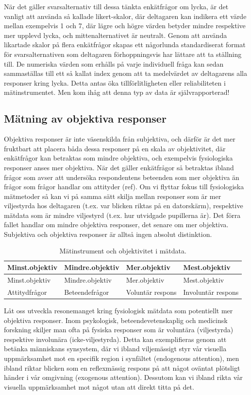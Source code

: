 \documentclass[
]{book}
\begin{document}
När det gäller svarsalternativ till dessa tänkta enkätfrågor om lycka, är det vanligt att använda så kallade likert-skalor, där deltagaren kan indikera ett värde mellan exempelvis 1 och 7, där lägre och högre värden betyder mindre respektive mer upplevd lycka, och mittenalternativet är neutralt. Genom att använda likartade skalor på flera enkätfrågor skapas ett någorlunda standardiserat format för svarsalternativen som deltagaren förhoppningsvis har lättare att ta ställning till. De numeriska värden som erhålls på varje individuell fråga kan sedan sammaställas till ett så kallat index genom att ta medelvärdet av deltagarens alla responser kring lycka. Detta antas öka tillförlitligheten eller reliabiliteten i mätinstrumentet. Men kom ihåg att denna typ av data är självrapporterad!

\hypertarget{sub07.3.3}{%
\subsection{Mätning av objektiva responser}\label{sub07.3.3}}

Objektiva responser är inte väsenskilda från subjektiva, och därför är det mer fruktbart att placera båda dessa responser på en skala av objektivitet, där enkätfrågor kan betraktas som mindre objektiva, och exempelvis fysiologiska responser anses mer objektiva. När det gäller enkätfrågor så betraktas ibland frågor som avser att undersöka respondentens beteenden som mer objektiva än frågor som frågor handlar om attityder (ref). Om vi flyttar fokus till fysiologiska mätmetoder så kan vi på samma sätt skilja mellan responser som är mer viljestyrda hos deltagaren (t.ex. var blicken riktas på en datorskärm), respektive mätdata som är mindre viljestyrd (t.ex. hur utvidgade pupillerna är). Det förra fallet handlar om mindre objektiva responser, det senare om mer objektiva. Subjektiva och objektiva responser är alltså ingen absolut distinktion.

\begin{longtable}[]{@{}llll@{}}
\caption{\label{tab:tab-02-07-3-3-01}Mätinstrument och objektivitet i mätdata.}\tabularnewline
\toprule
Minst.objektiv & Mindre.objektiv & Mer.objektiv & Mest.objektiv\tabularnewline
\midrule
\endfirsthead
\toprule
Minst.objektiv & Mindre.objektiv & Mer.objektiv & Mest.objektiv\tabularnewline
\midrule
\endhead
Attitydfrågor & Beteendefrågor & Voluntär respons & Involuntär respons\tabularnewline
\bottomrule
\end{longtable}

Låt oss utveckla resonemanget kring fysiologisk mätdata som potentiellt mer objektiva responser. Inom psykologisk, beteendevetenskaplig och medicinsk forskning skiljer man ofta på fysiska responser som är voluntära (viljestyrda) respektive involunära (icke-viljestyrda). Detta kan exemplifieras genom att betänka människans synsystem, där vi ibland viljemässigt styr vår visuella uppmärksamhet mot en specifik region i synfältet (endogenous attention), men ibland riktar blicken som en reflexmässig respons på att något oväntat plötsligt händer i vår omgivning (exogenous attention). Dessutom kan vi ibland rikta vår visuella uppmärksamhet mot något utan att direkt titta på det.
\end{document}
